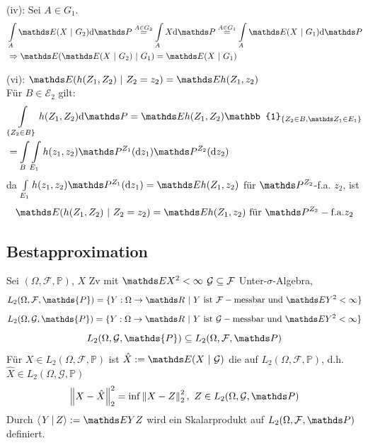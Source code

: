 (iv): Sei $A\in G_1$.
\begin{equation*}
\begin{aligned}
	&\int\limits_A \E(X~|~G_2)\dint\Pw \stackrel{A\in G_2}{=} \int\limits_A X\dint\Pw \stackrel{A\in G_1}{=} \int\limits_A \E(X~|~G_1)\dint\Pw\\
	&\Rightarrow \E(\E(X~|~G_2)~|~G_1)=\E(X~|~G_1)
\end{aligned}
\end{equation*}

(vi): \zz $\E(h(Z_1,Z_2)~|~ Z_2=z_2)=\E h(Z_1,z_2)$\\
Für $B\in \mathcal{E}_2$ gilt:
\begin{equation*}
\begin{aligned}
	&\int\limits_{\{Z_2\in B\}} h(Z_1,Z_2)\dint\Pw = \E h(Z_1,Z_2)\mathbb{1}_{\{Z_2\in B,\Z_1\in E_1 \}}\\
	&=\int\limits_B\int\limits_{E_1}h(z_1,z_2)\Pw^{Z_1}(\dint z_1)\Pw^{Z_2}(\dint z_2)
\end{aligned}
\end{equation*}
da $\int\limits_{E_1}h(z_1,z_2)\Pw^{Z_1}(\dint z_1)= \E h(Z_1,z_2)$ für $\Pw^{Z_2}$-f.a. $z_2$, ist 
\[\E(h(Z_1,Z_2)~|~ Z_2=z_2)=\E h(Z_1,z_2) \text{ für }\Pw^{Z_2}-\text{f.a.} z_2 \]

\subsection{Bestapproximation}
Sei $(\Omega,\mathcal{F},\mathds{P})$, $X$ Zv mit $\E X^2<\infty$ $\mathcal{G}\subseteq \mathcal{F}$ Unter-$\sigma$-Algebra,
\[L_2(\Omega,\mathcal{F},\mathds{P})= \{Y:\Omega\to \R~|~Y \text{ ist }\mathcal{F}-\text{messbar und }\E Y^2<\infty \} \]
\[L_2(\Omega,\mathcal{G},\mathds{P})= \{Y:\Omega\to \R~|~Y \text{ ist }\G-\text{messbar und }\E Y^2<\infty \} \]
\[ L_2(\Omega,\mathcal{G},\mathds{P})\subseteq L_2(\Omega,\mathcal{F},\Pw)\]
Für $X\in L_2(\Omega,\mathcal{F},\mathds{P})$ ist $\hat{X}:= \E(X~|~\mathcal{G})$ die  auf $L_2(\Omega,\mathcal{F},\mathds{P})$, d.h. $\hat{X}\in L_2(\Omega,\mathcal{G},\mathds{P})$
\[ \norm{X-\hat{X}}_2^2=\inf\norm{X-Z}_2^2,~Z\in L_2(\Omega,\G,\Pw) \]
Durch $\sprod{Y}{Z}:=\E YZ $ wird ein Skalarprodukt auf $L_2(\Omega,\mathcal{F},\Pw)$ definiert.

